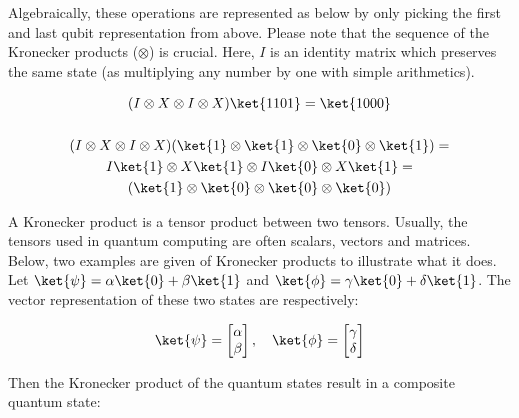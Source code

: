 \documentclass[../main.tex]{subfiles}
\begin{document}
Algebraically, these operations are represented as below by only picking the first and last qubit representation from above. Please note that the sequence of the Kronecker products ($\otimes$) is crucial. Here, $I$ is an identity matrix which preserves the same state (as multiplying any number by one with simple arithmetics).

\begin{gather*}
    (I \otimes X \otimes I \otimes X) \ket{1101} = \ket{1000}\\
    \\
    (I \otimes X \otimes I \otimes X) (\ket{1} \otimes \ket{1} \otimes \ket{0} \otimes \ket{1}) = \\
    I\ket{1} \otimes X\ket{1} \otimes I\ket{0} \otimes X\ket{1} = \\
    (\ket{1} \otimes \ket{0} \otimes \ket{0} \otimes \ket{0})
\label{eq: multi_quantum_circuit_representation}
\end{gather*}

A Kronecker product is a tensor product between two tensors. Usually, the tensors used in quantum computing are often scalars, vectors and matrices. Below, two examples are given of Kronecker products to illustrate what it does. Let $\ket{\psi} = \alpha \ket{0} + \beta \ket{1}$ and $\ket{\phi} = \gamma \ket{0} + \delta \ket{1}$. The vector representation of these two states are respectively:

\begin{equation*}
    \ket{\psi} = \begin{bmatrix} \alpha \\ \beta \end{bmatrix}, \quad  \ket{\phi} = \begin{bmatrix} \gamma \\ \delta \end{bmatrix}
    \label{eq: kronecker_vector_definition}
\end{equation*}

Then the Kronecker product of the quantum states result in a composite quantum state:
\end{document}
